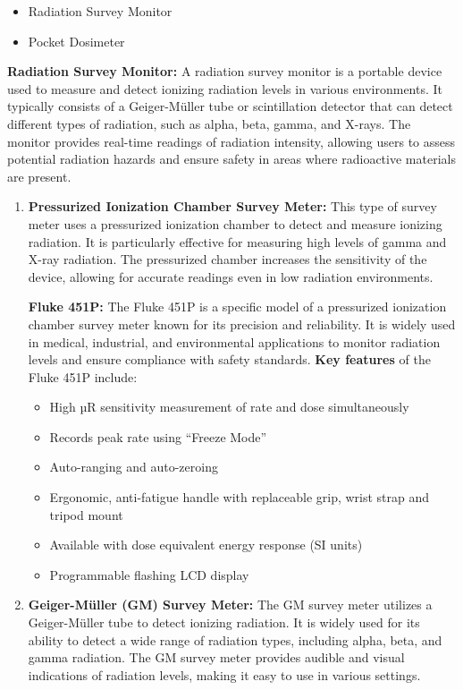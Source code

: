 \begin{itemize}
    \item Radiation Survey Monitor
    \item Pocket Dosimeter
\end{itemize}

\textbf{Radiation Survey Monitor:} A radiation survey monitor is a portable device used to measure and detect ionizing radiation levels in various environments. It typically consists of a Geiger-Müller tube or scintillation detector that can detect different types of radiation, such as alpha, beta, gamma, and X-rays. The monitor provides real-time readings of radiation intensity, allowing users to assess potential radiation hazards and ensure safety in areas where radioactive materials are present.

\begin{enumerate}
    \item \textbf{Pressurized Ionization Chamber Survey Meter:} This type of survey meter uses a pressurized ionization chamber to detect and measure ionizing radiation. It is particularly effective for measuring high levels of gamma and X-ray radiation. The pressurized chamber increases the sensitivity of the device, allowing for accurate readings even in low radiation environments.
    
    \textbf{Fluke 451P:} The Fluke 451P is a specific model of a pressurized ionization chamber survey meter known for its precision and reliability. It is widely used in medical, industrial, and environmental applications to monitor radiation levels and ensure compliance with safety standards. \textbf{Key features} of the Fluke 451P include:
    \begin{itemize}
        \item High µR sensitivity measurement of rate and dose simultaneously
        \item Records peak rate using “Freeze Mode”
        \item Auto-ranging and auto-zeroing
        \item Ergonomic, anti-fatigue handle with replaceable grip, wrist strap and tripod mount
        \item Available with dose equivalent energy response (SI units)
        \item Programmable flashing LCD display
    \end{itemize}
    \item \textbf{Geiger-Müller (GM) Survey Meter:} The GM survey meter utilizes a Geiger-Müller tube to detect ionizing radiation. It is widely used for its ability to detect a wide range of radiation types, including alpha, beta, and gamma radiation. The GM survey meter provides audible and visual indications of radiation levels, making it easy to use in various settings.
    

\end{enumerate}
